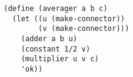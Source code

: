 \documentclass[a4paper,12pt]{article}
\begin{document}
\begin{lstlisting}
(define (averager a b c)
  (let ((u (make-connector))
        (v (make-connector)))
    (adder a b u)
    (constant 1/2 v)
    (multiplier u v c)
    'ok))
\end{lstlisting}
\end{document}

